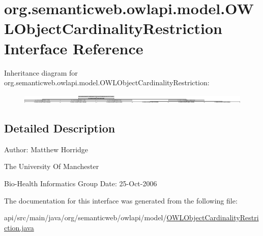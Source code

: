 \hypertarget{interfaceorg_1_1semanticweb_1_1owlapi_1_1model_1_1_o_w_l_object_cardinality_restriction}{\section{org.\-semanticweb.\-owlapi.\-model.\-O\-W\-L\-Object\-Cardinality\-Restriction Interface Reference}
\label{interfaceorg_1_1semanticweb_1_1owlapi_1_1model_1_1_o_w_l_object_cardinality_restriction}
}
Inheritance diagram for org.\-semanticweb.\-owlapi.\-model.\-O\-W\-L\-Object\-Cardinality\-Restriction\-:\begin{figure}[H]
\begin{center}
\leavevmode
\includegraphics[height=0.459770cm]{interfaceorg_1_1semanticweb_1_1owlapi_1_1model_1_1_o_w_l_object_cardinality_restriction}
\end{center}
\end{figure}


\subsection{Detailed Description}
Author\-: Matthew Horridge\par
 The University Of Manchester\par
 Bio-\/\-Health Informatics Group Date\-: 25-\/\-Oct-\/2006 

The documentation for this interface was generated from the following file\-:\begin{DoxyCompactItemize}
\item 
api/src/main/java/org/semanticweb/owlapi/model/\hyperlink{_o_w_l_object_cardinality_restriction_8java}{O\-W\-L\-Object\-Cardinality\-Restriction.\-java}\end{DoxyCompactItemize}
